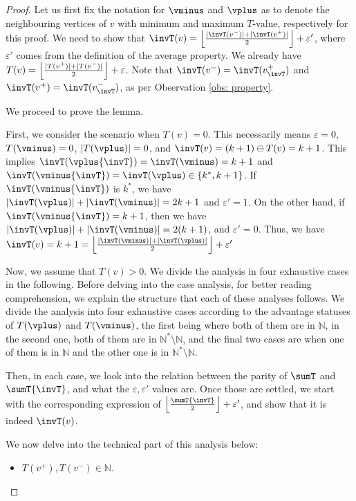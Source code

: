 \documentclass{theoretics}
\newcommand{\Nat}{\mathbb{N}}
\newcommand{\Natstro}{\mathbb{N}^* \setminus \mathbb{N}}
\newcommand{\eps}{\varepsilon}
\DeclarePairedDelimiter{\adjustfloor}{\lfloor}{\rfloor}
\newcommand{\floor}[1]{\adjustfloor*{#1}}
\begin{document}
\begin{proof}
	Let us first fix the notation for \(\vminus\) and \(\vplus\) as to denote the neighbouring vertices of \(v\) with minimum and maximum \(T\)-value, respectively for this proof.  
	We need to show that \(\invT(v) = \floor{\frac{|\invT(v^-)|+ |\invT(v^+)|}{2}} + \eps'\), where \(\eps'\) comes from the definition of the average property.
	We already have \(T(v) = \floor{\frac{|T(v^+)|+ |T(v^-)|}{2}} + \eps\).
	Note that \(\invT(v^-) = \invT(v^+_{\invT})\) and \(\invT(v^+) = \invT(v^-_{\invT})\), as per Observation \ref{obs: property}.  
	
We proceed to prove the lemma. 

First, we consider the scenario when \(T(v) = 0\). 
This necessarily means \(\eps = 0\), \(T(\vminus) = 0\), \(|T(\vplus)| = 0\), and \(\invT(v) = (k+1) \ominus T(v) = k+1\). 
This implies \(\invT(\vplus{\invT}) = \invT(\vminus) = k+1\) and \(\invT(\vminus{\invT}) = \invT(\vplus) \in \{k^*, k+1\}\). 
If \(\invT(\vminus{\invT})\) is \(k^*\), we have \(|\invT(\vplus)| + |\invT(\vminus)| = 2k+1\) and \(\eps' = 1\). 
On the other hand, if \(\invT(\vminus{\invT}) = k+1\), then we have \(|\invT(\vplus)| + |\invT(\vminus)| = 2(k+1)\), and \(\eps' = 0\). 
Thus, we have \(\invT(v) = k+1 = \floor{\frac{\left|\invT\left(\vminus\right)\right| + \left|\invT\left(\vplus\right)\right|}{2}} + \eps'\)

\smallskip

Now, we assume that \(T(v) > 0\). We divide the analysis in four exhaustive cases in the following. 
Before delving into the case analysis, for better reading comprehension, we explain the structure that each of these analyses follows. 
We divide the analysis into four exhaustive cases according to the advantage statuses of \(T(\vplus)\) and \(T(\vminus)\), the first being where both of them are in \(\Nat\), in the second one, both of them are  in \(\Natstro\), and the final two cases are when one of them is in \(\Nat\) and the other one is in \(\Natstro\). 

Then, in each case, we look into the relation between  the parity of \(\sumT\) and \(\sumT{\invT}\), and what the \(\eps, \eps'\) values are. 
Once those are settled, we start with the corresponding expression of \(\floor{\frac{\sumT{\invT}}{2}} + \eps'\), and show that it is indeed \(\invT(v)\).

We now delve into the technical part of this analysis  below: 
	\begin{itemize}
		\item \(T(v^+), T(v^-) \in \Nat\).
		

\end{itemize}
\end{proof}
\end{document}
